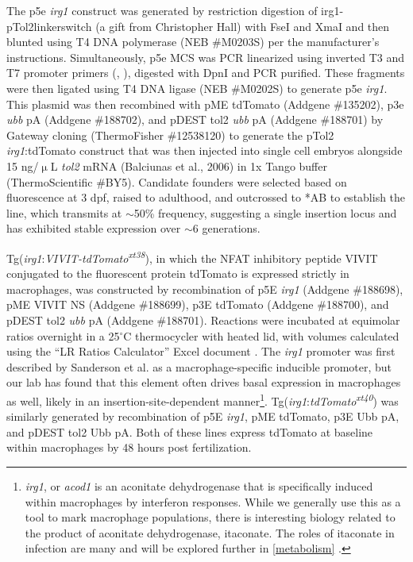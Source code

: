 The p5e \textit{irg1} construct was generated by restriction digestion of irg1\hyp{}pTol2linkerswitch \citep{Sanderson2015} (a gift from Christopher Hall) with FseI and XmaI and then blunted using T4 DNA polymerase (NEB \#M0203S) per the manufacturer's instructions. Simultaneously, p5e MCS \citep{Kwan2007} was PCR linearized using inverted T3 and T7 promoter primers (, ), digested with DpnI and PCR purified. These fragments were then ligated using T4 DNA ligase (NEB \#M0202S) to generate p5e \textit{irg1}. This plasmid was then recombined with pME tdTomato (Addgene \#135202), p3e \textit{ubb} pA (Addgene \#188702), and pDEST tol2 \textit{ubb} pA (Addgene \#188701) by Gateway cloning (ThermoFisher \#12538120) to generate the pTol2 \textit{irg1}:tdTomato construct that was then injected into single cell embryos alongside 15 ng/$\upmu$L \textit{tol2} mRNA (Balciunas et al., 2006) in 1x Tango buffer (ThermoScientific \#BY5). Candidate founders were selected based on fluorescence at 3 dpf, raised to adulthood, and outcrossed to *AB to establish the line, which transmits at $\sim$50\% frequency, suggesting a single insertion locus and has exhibited stable expression over ${\sim}$6 generations.

Tg(\textit{irg1}:\textit{VIVIT\hyp{}tdTomato\textsuperscript{xt38}}), in which the NFAT inhibitory peptide VIVIT conjugated to the fluorescent protein tdTomato is expressed strictly in macrophages, was constructed by recombination of p5E \textit{irg1} (Addgene \#188698), pME VIVIT NS (Addgene \#188699), p3E tdTomato (Addgene \#188700), and pDEST tol2 \textit{ubb} pA (Addgene \#188701). Reactions were incubated at equimolar ratios overnight in a 25$^{\circ}$C thermocycler with heated lid, with volumes calculated using the ``LR Ratios Calculator'' Excel document \citep{NFATZenodo2022}. The \textit{irg1} promoter was first described by Sanderson et al. as a macrophage\hyp{}specific inducible promoter, but our lab has found that this element often drives basal expression in macrophages as well, likely in an insertion\hyp{}site\hyp{}dependent manner\footnote{\textit{irg1}, or \textit{acod1} is an aconitate dehydrogenase that is specifically induced within macrophages by interferon responses. While we generally use this as a tool to mark macrophage populations, there is interesting biology related to the product of aconitate dehydrogenase, itaconate. The roles of itaconate in infection are many and will be explored further in \autoref{metabolism} \citep{Nair2018, ONeill2019, Wu2020, Lin2021, Coelho2022, Peace2022, Chen2022}.}. Tg(\textit{irg1}:\textit{tdTomato\textsuperscript{xt40}}) was similarly generated by recombination of p5E \textit{irg1}, pME tdTomato, p3E Ubb pA, and pDEST tol2 Ubb pA. Both of these lines express tdTomato at baseline within macrophages by 48 hours post fertilization.

